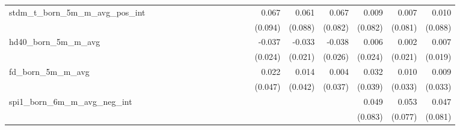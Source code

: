 \begin{tabular}{lrrrrrrrrrrrrrrrrrr}
stdm\_t\_born\_5m\_m\_avg\_pos\_int         &             &             &             &             &             &             &             &             &             &             &             &             &       0.067 &       0.061 &       0.067 &       0.009 &       0.007 &       0.010 \\ 
                                            &             &             &             &             &             &             &             &             &             &             &             &             &     (0.094) &     (0.088) &     (0.082) &     (0.082) &     (0.081) &     (0.088) \\ 
hd40\_born\_5m\_m\_avg                      &             &             &             &             &             &             &             &             &             &             &             &             &      -0.037 &      -0.033 &      -0.038 &       0.006 &       0.002 &       0.007 \\ 
                                            &             &             &             &             &             &             &             &             &             &             &             &             &     (0.024) &     (0.021) &     (0.026) &     (0.024) &     (0.021) &     (0.019) \\ 
fd\_born\_5m\_m\_avg                        &             &             &             &             &             &             &             &             &             &             &             &             &       0.022 &       0.014 &       0.004 &       0.032 &       0.010 &       0.009 \\ 
                                            &             &             &             &             &             &             &             &             &             &             &             &             &     (0.047) &     (0.042) &     (0.037) &     (0.039) &     (0.033) &     (0.033) \\ 
spi1\_born\_6m\_m\_avg\_neg\_int            &             &             &             &             &             &             &             &             &             &             &             &             &             &             &             &       0.049 &       0.053 &       0.047 \\ 
                                            &             &             &             &             &             &             &             &             &             &             &             &             &             &             &             &     (0.083) &     (0.077) &     (0.081) \\ 

\end{tabular}
